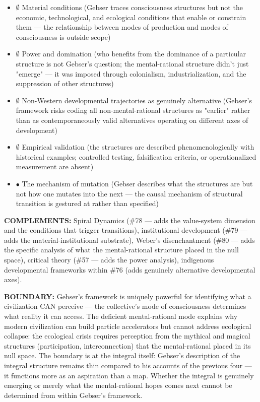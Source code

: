 \begin{itemize}[nosep,leftmargin=*]
  \item $\emptyset$ Material conditions (Gebser traces consciousness structures but not the economic, technological, and ecological conditions that enable or constrain them — the relationship between modes of production and modes of consciousness is outside scope)
  \item $\emptyset$ Power and domination (who benefits from the dominance of a particular structure is not Gebser's question; the mental-rational structure didn't just "emerge" — it was imposed through colonialism, industrialization, and the suppression of other structures)
  \item $\emptyset$ Non-Western developmental trajectories as genuinely alternative (Gebser's framework risks coding all non-mental-rational structures as "earlier" rather than as contemporaneously valid alternatives operating on different axes of development)
  \item $\emptyset$ Empirical validation (the structures are described phenomenologically with historical examples; controlled testing, falsification criteria, or operationalized measurement are absent)
  \item $\bullet$ The mechanism of mutation (Gebser describes what the structures are but not how one mutates into the next — the causal mechanism of structural transition is gestured at rather than specified)
\end{itemize}


\textbf{COMPLEMENTS:} Spiral Dynamics (\#78 — adds the value-system dimension and the conditions that trigger transitions), institutional development (\#79 — adds the material-institutional substrate), Weber's disenchantment (\#80 — adds the specific analysis of what the mental-rational structure placed in the null space), critical theory (\#57 — adds the power analysis), indigenous developmental frameworks within \#76 (adds genuinely alternative developmental axes).


\textbf{BOUNDARY:} Gebser's framework is uniquely powerful for identifying what a civilization CAN perceive — the collective's mode of consciousness determines what reality it can access. The deficient mental-rational mode explains why modern civilization can build particle accelerators but cannot address ecological collapse: the ecological crisis requires perception from the mythical and magical structures (participation, interconnection) that the mental-rational placed in its null space. The boundary is at the integral itself: Gebser's description of the integral structure remains thin compared to his accounts of the previous four — it functions more as an aspiration than a map. Whether the integral is genuinely emerging or merely what the mental-rational hopes comes next cannot be determined from within Gebser's framework.


